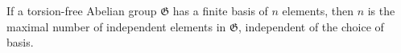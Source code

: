 If a torsion-free Abelian group $\mathfrak{G}$ has a finite basis of $n$ elements, then $n$ is the maximal number of independent elements in $\mathfrak{G}$, independent of the choice of basis.
